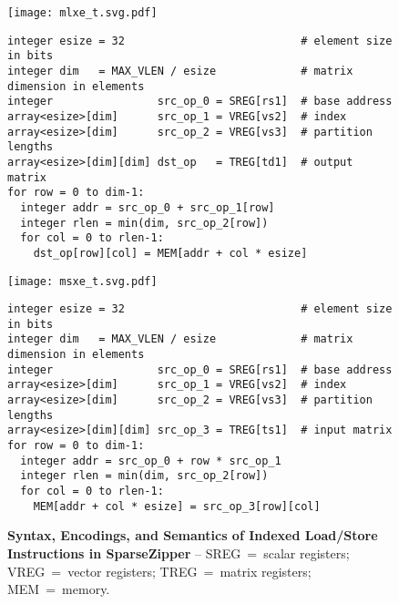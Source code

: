 \lstset{style=python-style}

\begin{figure*}[tp]
\centering


\texttt{[image: mlxe\_t.svg.pdf]}
\begin{lstlisting}[xleftmargin=0.025\tw]
integer esize = 32                           # element size in bits
integer dim   = MAX_VLEN / esize             # matrix dimension in elements
integer                src_op_0 = SREG[rs1]  # base address
array<esize>[dim]      src_op_1 = VREG[vs2]  # index
array<esize>[dim]      src_op_2 = VREG[vs3]  # partition lengths
array<esize>[dim][dim] dst_op   = TREG[td1]  # output matrix
for row = 0 to dim-1:
  integer addr = src_op_0 + src_op_1[row]
  integer rlen = min(dim, src_op_2[row])
  for col = 0 to rlen-1:
    dst_op[row][col] = MEM[addr + col * esize]
\end{lstlisting}


\texttt{[image: msxe\_t.svg.pdf]}
\begin{lstlisting}[xleftmargin=0.025\tw]
integer esize = 32                           # element size in bits
integer dim   = MAX_VLEN / esize             # matrix dimension in elements
integer                src_op_0 = SREG[rs1]  # base address
array<esize>[dim]      src_op_1 = VREG[vs2]  # index
array<esize>[dim]      src_op_2 = VREG[vs3]  # partition lengths
array<esize>[dim][dim] src_op_3 = TREG[ts1]  # input matrix
for row = 0 to dim-1:
  integer addr = src_op_0 + row * src_op_1
  integer rlen = min(dim, src_op_2[row])
  for col = 0 to rlen-1:
    MEM[addr + col * esize] = src_op_3[row][col]
\end{lstlisting}

\caption[Indexed Memory Instructions in SparseZipper]{
  \textbf{Syntax, Encodings, and Semantics of Indexed Load/Store Instructions in SparseZipper} --
  SREG~=~scalar registers;
  VREG~=~vector registers;
  TREG~=~matrix registers;
  MEM~=~memory.
}
\label{fig:spz-indexed-ld-st-insts}
\end{figure*}
